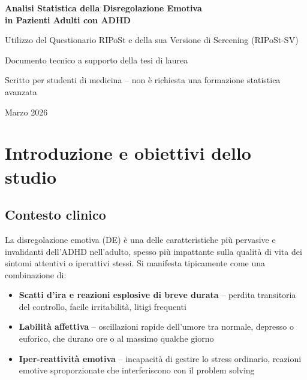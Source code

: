 \documentclass[12pt, a4paper]{article}
\begin{document}
\begin{titlepage}
    \centering
    \vspace*{2cm}
    {\LARGE\bfseries Analisi Statistica della Disregolazione Emotiva\\[0.5em]
    in Pazienti Adulti con ADHD\par}
    \vspace{1.5cm}
    {\large Utilizzo del Questionario RIPoSt e della sua Versione di Screening (RIPoSt-SV)\par}
    \vspace{2cm}
    {\normalsize Documento tecnico a supporto della tesi di laurea\par}
    \vspace{0.5cm}
    {\normalsize Scritto per studenti di medicina -- non è richiesta una formazione statistica avanzata\par}
    \vspace{3cm}
    {\small Marzo 2026}
\end{titlepage}

\tableofcontents
\newpage

\section{Introduzione e obiettivi dello studio}

\subsection{Contesto clinico}

La disregolazione emotiva (DE) è una delle caratteristiche più pervasive e invalidanti
dell'ADHD nell'adulto, spesso più impattante sulla qualità di vita dei sintomi attentivi o
iperattivi stessi. Si manifesta tipicamente come una combinazione di:

\begin{itemize}
    \item \textbf{Scatti d'ira e reazioni esplosive di breve durata} -- perdita transitoria del
          controllo, facile irritabilità, litigi frequenti
    \item \textbf{Labilità affettiva} -- oscillazioni rapide dell'umore tra normale, depresso o
          euforico, che durano ore o al massimo qualche giorno
    \item \textbf{Iper-reattività emotiva} -- incapacità di gestire lo stress ordinario, reazioni
          emotive sproporzionate che interferiscono con il problem solving
\end{itemize}
\end{document}
